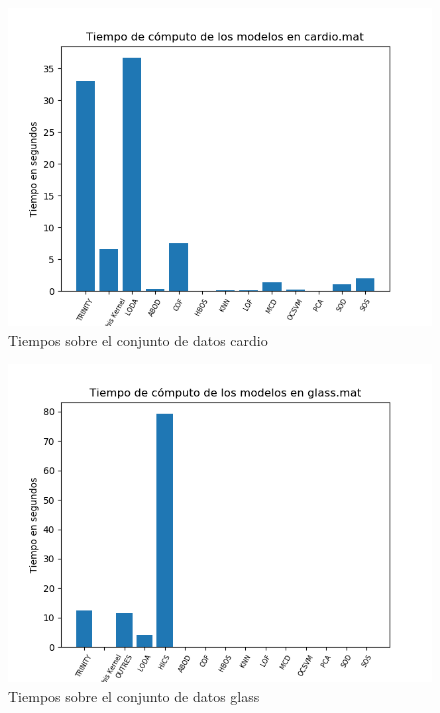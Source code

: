 \begin{figure}[H]
	\centering
	\includegraphics[scale=0.7]{imagenes/imgs-exp1/times/cardio}
	\caption{Tiempos sobre el conjunto de datos cardio}
	\label{cardio_times}
\end{figure}

\begin{figure}[H]
	\centering
	\includegraphics[scale=0.7]{imagenes/imgs-exp1/times/glass}
	\caption{Tiempos sobre el conjunto de datos glass}
	\label{glass_times}
\end{figure}

